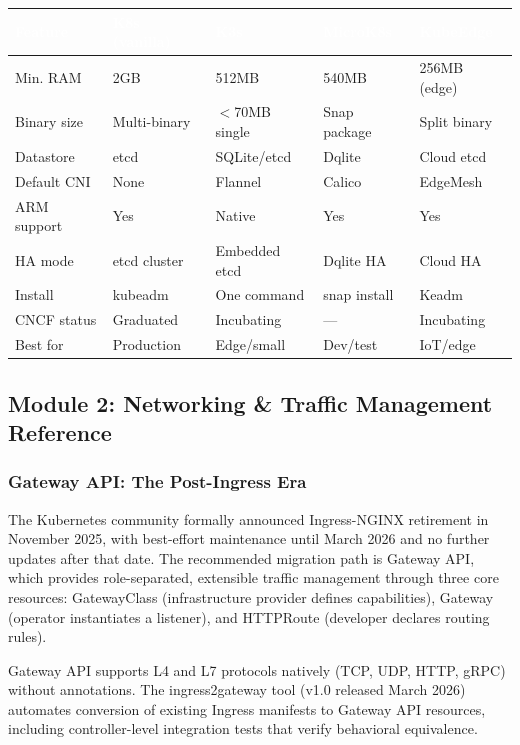 \documentclass[11pt,letterpaper]{article}
\newcommand{\tableheader}[1]{\textbf{\sffamily\textcolor{white}{#1}}}
\begin{document}
\begin{center}
\begin{tabularx}{\textwidth}{L{2.8cm}XXXX}
\toprule
{}
\tableheader{Feature} & \tableheader{K8s (vanilla)} & \tableheader{K3s} & \tableheader{MicroK8s} & \tableheader{KubeEdge} \\
\midrule
Min. RAM & 2GB & 512MB & 540MB & 256MB (edge) \\
Binary size & Multi-binary & $<$70MB single & Snap package & Split binary \\
Datastore & etcd & SQLite/etcd & Dqlite & Cloud etcd \\
Default CNI & None & Flannel & Calico & EdgeMesh \\
ARM support & Yes & Native & Yes & Yes \\
HA mode & etcd cluster & Embedded etcd & Dqlite HA & Cloud HA \\
Install & kubeadm & One command & snap install & Keadm \\
CNCF status & Graduated & Incubating & --- & Incubating \\
Best for & Production & Edge/small & Dev/test & IoT/edge \\
\bottomrule
\end{tabularx}
\end{center}

\subsection{Module 2: Networking \& Traffic Management Reference}

\subsubsection{Gateway API: The Post-Ingress Era}
The Kubernetes community formally announced Ingress-NGINX retirement in November 2025, with best-effort maintenance until March 2026 and no further updates after that date. The recommended migration path is Gateway API, which provides role-separated, extensible traffic management through three core resources: GatewayClass (infrastructure provider defines capabilities), Gateway (operator instantiates a listener), and HTTPRoute (developer declares routing rules).

Gateway API supports L4 and L7 protocols natively (TCP, UDP, HTTP, gRPC) without annotations. The ingress2gateway tool (v1.0 released March 2026) automates conversion of existing Ingress manifests to Gateway API resources, including controller-level integration tests that verify behavioral equivalence.
\end{document}
